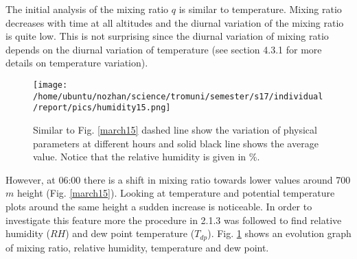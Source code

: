 \documentclass[a4paper,12pt]{article}
\numberwithin{equation}{section} %
\begin{document}
The initial analysis of the mixing ratio $q$ is similar to temperature. Mixing ratio decreases with time at all altitudes and the diurnal variation of the mixing ratio is quite low. This is not surprising since the diurnal variation of mixing ratio depends on the diurnal variation of temperature (see section 4.3.1 for more details on temperature variation). 

\begin{figure}[bhp]
\texttt{[image: /home/ubuntu/nozhan/science/tromuni/semester/s17/individual/report/pics/humidity15.png]}
\caption{Similar to Fig. \ref{march15} dashed line show the variation of physical parameters at different hours and solid black line shows the average value. Notice that the relative humidity is given in $\%$.}
\label{humidity15}
\end{figure}

However, at 06:00 there is a shift in mixing ratio towards lower values around 700 $m$ height (Fig. \ref{march15}). Looking at temperature and potential temperature plots around the same height a sudden increase is noticeable. In order to investigate this feature more the procedure in 2.1.3 was followed to find relative humidity ($RH$) and dew point temperature ($T_{dp}$). Fig. \ref{humidity15} shows an evolution graph of mixing ratio, relative humidity, temperature and dew point. 
\end{document}

